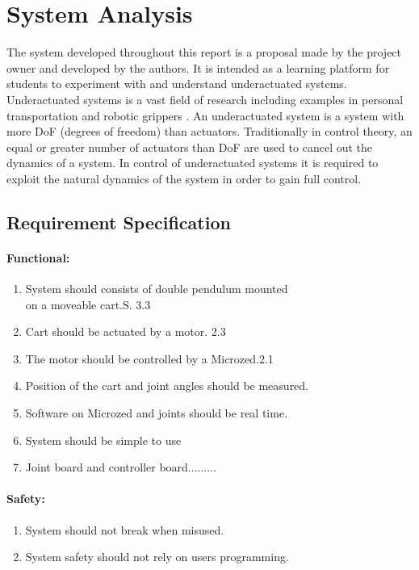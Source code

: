 \section{System Analysis}
The system developed throughout this report is a proposal made by the project owner and developed by the authors.
It is intended as a learning platform for students to experiment with and understand underactuated systems.
Underactuated systems is a vast field of research including examples in personal transportation \cite{scooter} \cite{segway} and robotic grippers \cite{threegripper} \cite{softgripper}.
An underactuated system is a system with more DoF (degrees of freedom) than actuators.
Traditionally in control theory, an equal or greater number of actuators than DoF are used to cancel out the dynamics of a system.
In control of underactuated systems it is required to exploit the natural dynamics of the system \cite{mitunderactuated} in order to gain full control.

\subsection{Requirement Specification}
\label{sub:requirements}

\paragraph{Functional:}
\begin{enumerate}	\item System should consists of double pendulum mounted\\ on a moveable cart.\hfill S. 3.3
	\item Cart should be actuated by a motor. \hfill 2.3
	\item The motor should be controlled by a Microzed.\hfill 2.1
	\item Position of the cart and joint angles should be measured.
	\item Software on Microzed and joints should be real time.
	\item System should be simple to use
	\item Joint board and controller board.........
\end{enumerate}

\paragraph{Safety:}
\begin{enumerate}[resume]
	\item System should not break when misused.
	\item System safety should not rely on users programming.
\end{enumerate}

